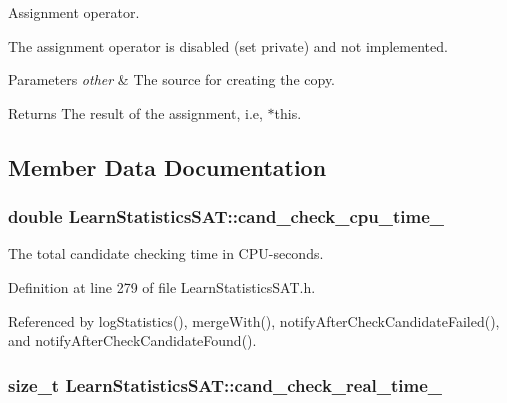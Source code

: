 Assignment operator. 

The assignment operator is disabled (set private) and not implemented.


\begin{DoxyParams}{Parameters}
{\em other} & The source for creating the copy. \\
\hline
\end{DoxyParams}
\begin{DoxyReturn}{Returns}
The result of the assignment, i.\-e, $\ast$this. 
\end{DoxyReturn}


\subsection{Member Data Documentation}
\hypertarget{classLearnStatisticsSAT_a2ab5cd522b7a4d700a11c0bb430baa81}{
\subsubsection[{cand\-\_\-check\-\_\-cpu\-\_\-time\-\_\-}]{\setlength{\rightskip}{0pt plus 5cm}double Learn\-Statistics\-S\-A\-T\-::cand\-\_\-check\-\_\-cpu\-\_\-time\-\_\-\hspace{0.3cm}{\ttfamily [protected]}}}\label{classLearnStatisticsSAT_a2ab5cd522b7a4d700a11c0bb430baa81}


The total candidate checking time in C\-P\-U-\/seconds. 



Definition at line 279 of file Learn\-Statistics\-S\-A\-T.\-h.



Referenced by log\-Statistics(), merge\-With(), notify\-After\-Check\-Candidate\-Failed(), and notify\-After\-Check\-Candidate\-Found().

\hypertarget{classLearnStatisticsSAT_a2e0611b0c6f80cbc7b36f25ce5e89db9}{
\subsubsection[{cand\-\_\-check\-\_\-real\-\_\-time\-\_\-}]{\setlength{\rightskip}{0pt plus 5cm}size\-\_\-t Learn\-Statistics\-S\-A\-T\-::cand\-\_\-check\-\_\-real\-\_\-time\-\_\-\hspace{0.3cm}{\ttfamily [protected]}}}\label{classLearnStatisticsSAT_a2e0611b0c6f80cbc7b36f25ce5e89db9}


